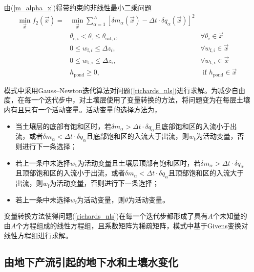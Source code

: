 由(\ref{m_alpha_x})得带约束的非线性最小二乘问题
\begin{equation}\label{richards_nls}
  \begin{aligned}
    \min _{\vec{x}} f_{2}(\vec{x})=& \min _{\vec{x}} \sum_{\alpha=1}^{A}\left[\delta m_{\alpha}(\vec{x})-\Delta t \cdot \delta q_{\alpha}(\vec{x})\right]^{2} \\
    & \theta_{\mathrm{r},i}<\theta_{\mathrm{i}} \leqslant \theta_{\mathrm{sat},i}, & \forall \theta_{i} \in \vec{x} \\
    & 0 \leqslant w_{\mathrm{f},i} \leqslant \Delta z_{i},               & \forall w_{\mathrm{f},i} \in \vec{x} \\
    & 0 \leqslant w_{\mathrm{t},i} \leqslant \Delta z_{i},               & \forall w_{\mathrm{t},i} \in \vec{x} \\
    & h_{\mathrm{ {pond }}} \geqslant 0,                               & \text{ if } h_{\mathrm{ {pond }}} \in \vec{x}
  \end{aligned}
\end{equation}

模式中采用Gauss--Newton迭代算法对问题(\ref{richards_nls})进行求解。为减少自由度，在每一个迭代步中，对土壤层使用了变量转换的方法，将问题变为在每层土壤内有且只有一个活动变量。活动变量的选择方法为，
\begin{itemize}
  \item 当土壤层的底部有饱和区时，若$\delta m_{\alpha}>\Delta t \cdot \delta q_{\alpha}$且底部饱和区的入流小于出流，或者$\delta m_{\alpha}<\Delta t \cdot \delta q_{\alpha}$且底部饱和区的入流大于出流，则$w_{\mathrm {t}} $为活动变量，否则进行下一条选择；
  \item 若上一条中未选择$w_{\mathrm {t}} $为活动变量且土壤层顶部有饱和区时，若$\delta m_{\alpha}>\Delta t \cdot \delta q_{\alpha}$且顶部饱和区的入流小于出流，或者$\delta m_{\alpha}<\Delta t \cdot \delta q_{\alpha}$且顶部饱和区的入流大于出流，则$w_{\mathrm {f}} $为活动变量，否则进行下一条选择；
  \item 若上一条中未选择$w_{\mathrm {f}} $为活动变量，则$\theta$为活动变量。
\end{itemize}

变量转换方法使得问题(\ref{richards_nls})在每一个迭代步都形成了具有$A$个未知量的由$A$个方程组成的线性方程组，且系数矩阵为稀疏矩阵，模式中基于Givens变换对线性方程组进行求解。

\subsection{由地下产流引起的地下水和土壤水变化} \label{sec:change_of_zwt_vsf}

